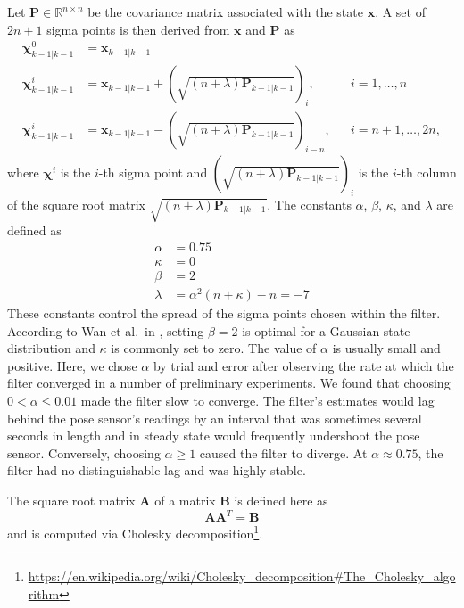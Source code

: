 Let $\mathbf{P} \in \mathbb{R}^{n \times n}$ be the covariance matrix associated with the state $\mathbf{x}$. A set of $2n + 1$ sigma points is then derived from $\mathbf{x}$ and $\mathbf{P}$ as
%
\begin{align}
\bm{\chi}^{0}_{k-1 | k-1} &= \mathbf{x}_{k-1 | k-1} \nonumber\\
\bm{\chi}^{i}_{k-1 | k-1} &= \mathbf{x}_{k-1 | k-1} + \left( \sqrt{\left( n + \lambda \right) \mathbf{P}_{k-1 | k-1}} \right)_{i}, &&i = 1, \dots, n \\
\bm{\chi}^{i}_{k-1 | k-1} &= \mathbf{x}_{k-1 | k-1} - \left( \sqrt{\left( n + \lambda \right) \mathbf{P}_{k-1 | k-1}} \right)_{i-n}, &&i = n+1, \dots, 2n, \nonumber
\end{align}
%
where $\bm{\chi}^{i}$ is the $i$-th sigma point and $\left( \sqrt{\left( n + \lambda \right) \mathbf{P}_{k-1 | k-1}} \right)_{i}$ is the $i$-th column of the square root matrix $\sqrt{\left( n + \lambda \right) \mathbf{P}_{k-1 | k-1}}$. The constants $\alpha$, $\beta$, $\kappa$, and $\lambda$ are defined as
%
\begin{align}
\alpha &= 0.75 \\
\kappa &= 0 \\
\beta &= 2 \\
\lambda &= \alpha^{2} \left( n + \kappa \right) - n = -7
\end{align}
%
These constants control the spread of the sigma points chosen within the filter. According to Wan et al.\ in \cite{Wan2000}, setting $\beta = 2$ is optimal for a Gaussian state distribution and $\kappa$ is commonly set to zero. The value of $\alpha$ is usually small and positive. Here, we chose $\alpha$ by trial and error after observing the rate at which the filter converged in a number of preliminary experiments. We found that choosing $0 < \alpha \leq 0.01$ made the filter slow to converge. The filter's estimates would lag behind the pose sensor's readings by an interval that was sometimes several seconds in length and in steady state would frequently undershoot the pose sensor. Conversely, choosing $\alpha \geq 1$ caused the filter to diverge. At $\alpha \approx 0.75$, the filter had no distinguishable lag and was highly stable.

The square root matrix $\mathbf{A}$ of a matrix $\mathbf{B}$ is defined here as
%
\begin{equation}
\mathbf{A} \mathbf{A}^{T} = \mathbf{B}
\end{equation}
%
and is computed via Cholesky decomposition\footnote{\url{https://en.wikipedia.org/wiki/Cholesky_decomposition\#The_Cholesky_algorithm}}.


